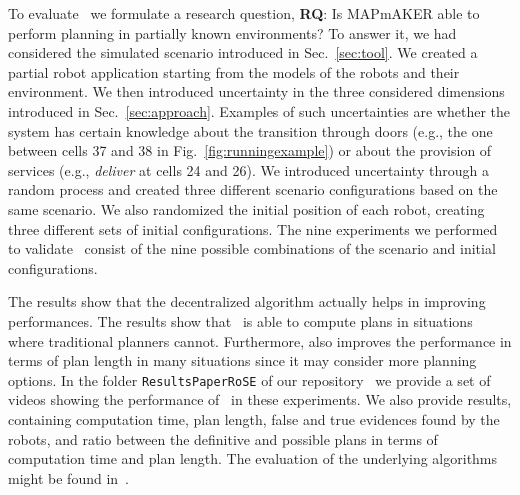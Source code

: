

To evaluate  \toolName\ we formulate a research question,
\textbf{RQ}: Is MAPmAKER able to perform planning in partially known environments?
To answer it, we  had considered the simulated scenario introduced in Sec.~\ref{sec:tool}.
We created a partial robot application starting from the models of the robots and their environment.
We then introduced uncertainty in the three considered dimensions introduced in Sec.~\ref{sec:approach}.
Examples of such uncertainties are whether the system has certain knowledge about the transition through doors (e.g., the one between cells 37 and 38 in Fig.~\ref{fig:runningexample}) or about the provision of services (e.g., \emph{deliver} at cells 24 and 26).
We introduced uncertainty through a random process and created three different scenario configurations based on the same scenario.
We also randomized the initial position of each robot, creating three different sets of initial configurations.
The nine experiments we performed to validate \toolName~consist of the nine possible combinations of the scenario and initial configurations.

The results show that the decentralized algorithm actually helps in improving performances.
The results show that \toolName~is able to compute plans in situations where traditional planners cannot. 
Furthermore, \toolName also improves the performance in terms of plan length in many situations since it may consider more planning options.
In the folder \texttt{ResultsPaperRoSE} of our repository~\cite{repo} we provide a set of videos showing the performance of \toolName~in these experiments.
We also provide results, containing computation time, plan length, false and true evidences found by the robots, and ratio between the definitive and possible plans in terms of computation time and plan length.
The evaluation of the underlying algorithms might be found in~\cite{menghi2018multi}. 

